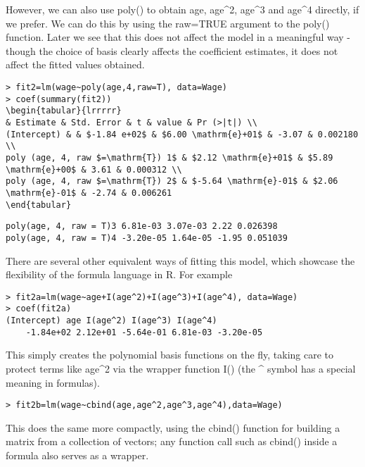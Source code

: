 \documentclass[10pt]{article}
\begin{document}
However, we can also use poly() to obtain age, age\^{}2, age\^{}3 and age\^{}4 directly, if we prefer. We can do this by using the raw=TRUE argument to the poly() function. Later we see that this does not affect the model in a meaningful way - though the choice of basis clearly affects the coefficient estimates, it does not affect the fitted values obtained.

\begin{verbatim}
> fit2=lm(wage~poly(age,4,raw=T), data=Wage)
> coef(summary(fit2))
\begin{tabular}{lrrrrr} 
& Estimate & Std. Error & t & value & Pr (>|t|) \\
(Intercept) & & $-1.84 e+02$ & $6.00 \mathrm{e}+01$ & -3.07 & 0.002180 \\
poly (age, 4, raw $=\mathrm{T}) 1$ & $2.12 \mathrm{e}+01$ & $5.89 \mathrm{e}+00$ & 3.61 & 0.000312 \\
poly (age, 4, raw $=\mathrm{T}) 2$ & $-5.64 \mathrm{e}-01$ & $2.06 \mathrm{e}-01$ & -2.74 & 0.006261
\end{tabular}
\end{verbatim}

\begin{verbatim}
poly(age, 4, raw = T)3 6.81e-03 3.07e-03 2.22 0.026398
poly(age, 4, raw = T)4 -3.20e-05 1.64e-05 -1.95 0.051039
\end{verbatim}

There are several other equivalent ways of fitting this model, which showcase the flexibility of the formula language in R. For example

\begin{verbatim}
> fit2a=lm(wage~age+I(age^2)+I(age^3)+I(age^4), data=Wage)
> coef(fit2a)
(Intercept) age I(age^2) I(age^3) I(age^4)
    -1.84e+02 2.12e+01 -5.64e-01 6.81e-03 -3.20e-05
\end{verbatim}

This simply creates the polynomial basis functions on the fly, taking care to protect terms like age\^{}2 via the wrapper function I() (the \^{} symbol has a special meaning in formulas).

\begin{verbatim}
> fit2b=lm(wage~cbind(age,age^2,age^3,age^4),data=Wage)
\end{verbatim}

This does the same more compactly, using the cbind() function for building a matrix from a collection of vectors; any function call such as cbind() inside a formula also serves as a wrapper.
\end{document}
